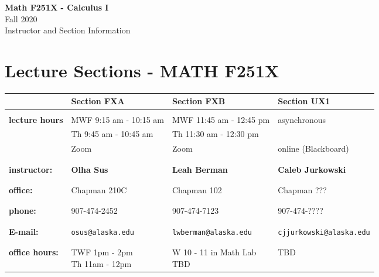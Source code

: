 \documentclass[11pt,fleqn]{article}
\begin{document}
\setcounter{secnumdepth}{0}

\vspace*{-1in}
\begin{center}
\large{\textbf{Math F251X - Calculus I}}\\

\large{Fall 2020\\ Instructor and Section Information}
\end{center}

\vfill

\section{Lecture Sections - MATH F251X}

\begin{tabular}{| l || l | l | l |}
\hline \hline
&Section FXA&Section FXB&Section UX1\\
\hline \hline
&&&\\
\textbf{lecture hours}&MWF 9:15 am - 10:15 am&MWF 11:45 am - 12:45 pm& 
asynchronous\\
&Th 9:45 am - 10:45 am& Th 11:30 am - 12:30 pm & \\
&Zoom & Zoom &  online (Blackboard)\\
&&&\\
\hline
&&&\\
\textbf{instructor:}&\textbf{Olha Sus}&\textbf{Leah Berman}&\textbf{Caleb Jurkowski}\\
&&&\\
\hline
&&&\\
\textbf{office:}&Chapman 210C&Chapman 102& Chapman ???\\
&&&\\
\hline
&&&\\
\textbf{phone:}&907-474-2452&907-474-7123&907-474-????\\ 
&&&\\\hline
&&&\\
\textbf{E-mail:}&\texttt{osus@alaska.edu} &\texttt{lwberman@alaska.edu} &\texttt{cjjurkowski@alaska.edu}\\ &&&\\ \hline
&&&\\ \textbf{office hours:}&\parbox{5 cm}{TWF 1pm - 2pm\\Th 11am - 12pm} &\parbox{5cm}{W 10 - 11 in Math Lab\\ TBD}&TBD\\ 
 \hline
\end{tabular}
\end{document}

